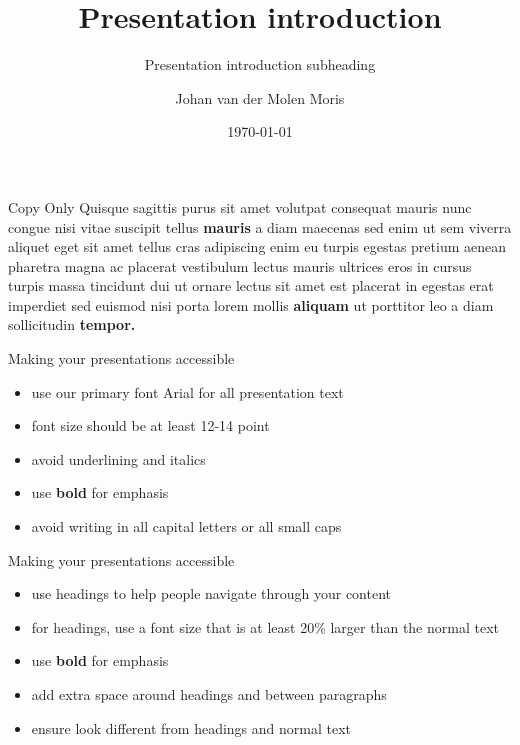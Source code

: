 \documentclass{beamer}
\author[]{Johan van der Molen Moris}
\title[]{Presentation introduction}
\subtitle[]{Presentation introduction subheading}
\institute{MRC Biostatistics Unit}
\date{\today}
\begin{document}
\begin{frame}[plain]
\titlepage
\setcounter{framenumber}{0}
\end{frame}
%

\begin{frame}[t]{Copy Only} 
    Quisque sagittis purus sit amet volutpat consequat mauris nunc congue nisi vitae suscipit tellus \textbf{mauris} a diam maecenas sed enim ut sem viverra aliquet eget sit amet tellus cras adipiscing enim eu turpis egestas pretium aenean pharetra magna ac placerat vestibulum lectus mauris ultrices eros in cursus turpis massa tincidunt dui ut ornare lectus sit amet est placerat in egestas erat imperdiet sed euismod nisi porta lorem mollis \textbf{aliquam} ut porttitor leo a diam sollicitudin \textbf{tempor.}
\end{frame}

\begin{frame}[t]{Making your presentations accessible}
  \begin{itemize}
    \item use our primary font Arial for all presentation text
    \item font size should be at least 12-14 point
    \item avoid underlining and italics
    \item use \textbf{bold} for emphasis
    \item avoid writing in all capital letters or all small caps
  \end{itemize}
\end{frame}

\begin{frame}[t]{Making your presentations accessible}
    \begin{itemize}
      \item use headings to help people navigate through your content
      \item for headings, use a font size that is at least 20\% larger than the normal text
      \item use \textbf{bold} for emphasis
      \item add extra space around headings and between paragraphs
      \item ensure \alert{\underline{}} look different from headings and normal text
    \end{itemize}
  \end{frame}
\end{document}

